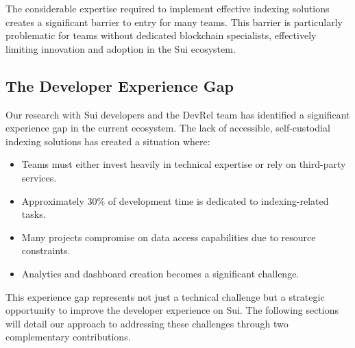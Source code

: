 The considerable expertise required to implement effective indexing solutions creates a significant barrier to entry for many teams. This barrier is particularly problematic for teams without dedicated blockchain specialists, effectively limiting innovation and adoption in the Sui ecosystem.

\subsection{The Developer Experience Gap}

Our research with Sui developers and the DevRel team has identified a significant experience gap in the current ecosystem. The lack of accessible, self-custodial indexing solutions has created a situation where:

\begin{itemize}
    \item Teams must either invest heavily in technical expertise or rely on third-party services.
    \item Approximately 30\% of development time is dedicated to indexing-related tasks.
    \item Many projects compromise on data access capabilities due to resource constraints.
    \item Analytics and dashboard creation becomes a significant challenge.
\end{itemize}

This experience gap represents not just a technical challenge but a strategic opportunity to improve the developer experience on Sui. The following sections will detail our approach to addressing these challenges through two complementary contributions. 